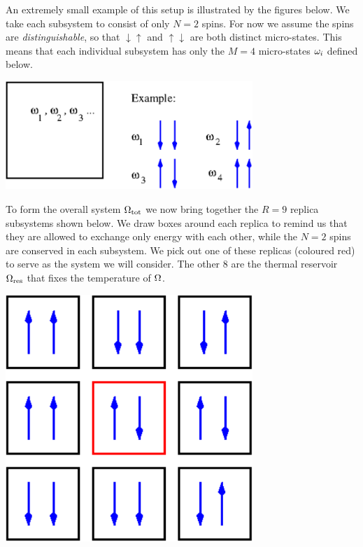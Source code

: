 An extremely small example of this setup is illustrated by the figures below.
We take each subsystem to consist of only $N = 2$ spins.
For now we assume the spins are \textit{distinguishable}, so that $\downarrow\uparrow$ and $\uparrow\downarrow$ are both distinct micro-states.
This means that each individual subsystem has only the $M = 4$ micro-states $\omega_i$ defined below.
\begin{center}
  \includegraphics[width=0.7\textwidth]{figs/week03_spin-system.pdf}
\end{center}
To form the overall system $\Omega_{\text{tot}}$ we now bring together the $R = 9$ replica subsystems shown below.
We draw boxes around each replica to remind us that they are allowed to exchange only energy with each other, while the $N = 2$ spins are conserved in each subsystem.
We pick out one of these replicas (coloured red) to serve as the system \Om we will consider.
The other $8$ are the thermal reservoir $\Omega_{\text{res}}$ that fixes the temperature of $\Omega$.
\begin{center}
  \includegraphics[width=0.7\textwidth]{figs/week03_spin-reservoir.pdf}
\end{center}

